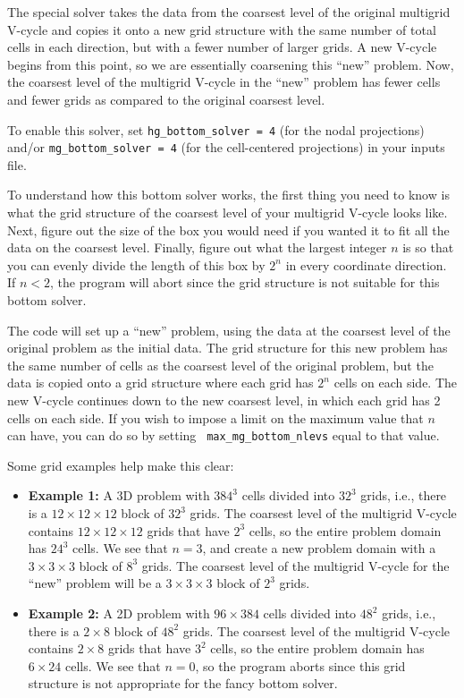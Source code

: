 The special solver takes the data from the coarsest level of the
original multigrid V-cycle and copies it onto a new grid structure with
the same number of total cells in each direction, but with a fewer
number of larger grids.  A new V-cycle begins from this point, so we
are essentially coarsening this ``new'' problem.  Now, the coarsest
level of the multigrid V-cycle in the ``new'' problem has fewer cells
and fewer grids as compared to the original coarsest level.

To enable this solver, set {\tt hg\_bottom\_solver = 4} (for the nodal
projections) and/or {\tt mg\_bottom\_solver = 4} (for the
cell-centered projections) in your inputs file.

To understand how this bottom solver works, the first thing you need
to know is what the grid structure of the coarsest level of your
multigrid V-cycle looks like.  Next, figure out the size of the box you
would need if you wanted it to fit all the data on the coarsest level.
Finally, figure out what the largest integer $n$ is so that you can evenly
divide the length of this box by $2^n$ in every coordinate direction.
If $n < 2$, the program will abort since the grid structure is not
suitable for this bottom solver.

The code will set up a ``new'' problem, using the data at the
coarsest level of the original problem as the initial data.  The grid
structure for this new problem has the same number of cells as the
coarsest level of the original problem, but the data is copied onto a
grid structure where each grid has $2^n$ cells on each side.  The new
V-cycle continues down to the new coarsest level, in which each grid
has 2 cells on each side.  If you wish to impose a limit on the
maximum value that $n$ can have, you can do so by setting {\tt
max\_mg\_bottom\_nlevs} equal to that value.

Some grid examples help make this clear:
\begin{itemize}
\item {\bf Example 1:} A 3D problem with $384^3$ cells divided into $32^3$
grids, i.e., there is a $12\times 12\times 12$ block of $32^3$ grids.
The coarsest level of the multigrid V-cycle contains $12\times
12\times 12$ grids that have $2^3$ cells, so the entire problem domain
has $24^3$ cells.  We see that $n=3$, and create a new problem domain
with a $3\times 3\times 3$ block of $8^3$ grids.  The coarsest level
of the multigrid V-cycle for the ``new'' problem will be a $3\times
3\times 3$ block of $2^3$ grids.

\item {\bf Example 2:} A 2D problem with $96\times 384$ cells divided into
$48^2$ grids, i.e., there is a $2\times 8$ block of $48^2$ grids.  The
coarsest level of the multigrid V-cycle contains $2\times 8$ grids
that have $3^2$ cells, so the entire problem domain has $6\times 24$
cells.  We see that $n=0$, so the program aborts since this grid
structure is not appropriate for the fancy bottom solver.
\end{itemize}




